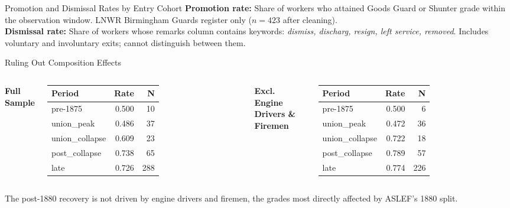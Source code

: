 \documentclass[10pt,aspectratio=169]{beamer}
\begin{document}
\begin{frame}{Promotion and Dismissal Rates by Entry Cohort}
\vspace{0.18cm}
\scriptsize
\textbf{Promotion rate:} Share of workers who attained Goods Guard or Shunter grade within the observation window. LNWR Birmingham Guards register only ($n=423$ after cleaning).\\
\textbf{Dismissal rate:} Share of workers whose remarks column contains keywords: \textit{dismiss, discharg, resign, left service, removed}. Includes voluntary and involuntary exits; cannot distinguish between them.
\end{frame}

\begin{frame}{Ruling Out Composition Effects}
\begin{columns}[T,onlytextwidth]
\textbf{\color{RailwayBlue}Full Sample}
\vspace{0.15cm}

\small
\begin{tabular}{lrr}
\toprule
\textbf{Period} & \textbf{Rate} & \textbf{N} \\
\midrule
pre-1875 & 0.500 & 10 \\
union\_peak & 0.486 & 37 \\
union\_collapse & 0.609 & 23 \\
post\_collapse & 0.738 & 65 \\
late & 0.726 & 288 \\
\bottomrule
\end{tabular}

\textbf{\color{RailwayBlue}Excl. Engine Drivers \& Firemen}
\vspace{0.15cm}

\small
\begin{tabular}{lrr}
\toprule
\textbf{Period} & \textbf{Rate} & \textbf{N} \\
\midrule
pre-1875 & 0.500 & 6 \\
union\_peak & 0.472 & 36 \\
union\_collapse & 0.722 & 18 \\
post\_collapse & 0.789 & 57 \\
late & 0.774 & 226 \\
\bottomrule
\end{tabular}
\end{columns}

\vspace{0.5cm}
\footnotesize The post-1880 recovery is not driven by engine drivers and firemen, the grades most directly affected by ASLEF's 1880 split.
\end{frame}
\end{document}
